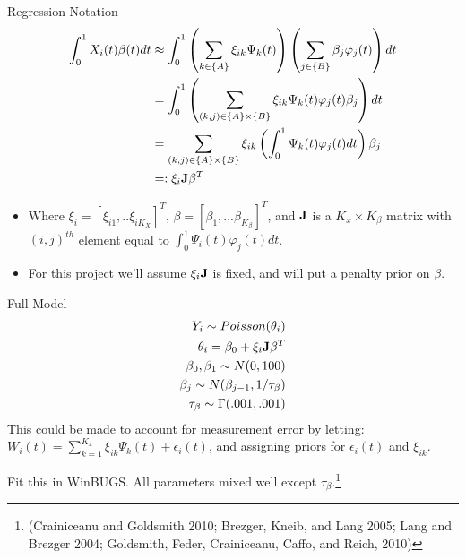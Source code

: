 \documentclass[9 pt]{beamer}
\newcommand{\bi}{\begin{itemize}}
\newcommand{\ei}{\end{itemize}}
\newcommand{\es}[1]{\begin{equation*}\begin{split} #1 \end{split} \end{equation*}}
\begin{document}
\begin{frame}{Regression Notation}
\es{
\int_0^1 X_i(t)\beta(t) dt & \approx \int_0^1 \left( \sum_{k\in \{A\} } \xi_{ik} \Psi_k(t) \right) \left( \sum_{ j\in \{ B\}} \beta_j \varphi_j(t)  \right)dt   \\
 &=\int_0^1 \left(  \sum_{(k,j)\in \{A\}\times \{B\} } \xi_{ik} \Psi_k(t)    \varphi_j(t)   \beta_j \right) dt \\
 &=  \sum_{(k,j)\in \{A\}\times \{B\} } \xi_{ik}  \left( \int_0^1 \Psi_k(t)    \varphi_j(t)  dt \right) \beta_j  \\
 &=: \xi_{i} \bold{J} \beta^T  \\
 }

 \bi
\item<1->   Where $\xi_i=[\xi_{i1},..\xi_{iK_X}]^T$, $\beta=[\beta_1,...\beta_{K_\beta}]^T$, and $\bold{J}$ is a $K_x \times K_\beta$ matrix with $(i,j)^{th}$ element equal to $ \int_0^1 \Psi_i(t)    \varphi_j(t) dt$.
\item<2->  For this project we'll assume $\xi_{i} \bold{J}$ is fixed, and will put a penalty prior on $\beta$.
\ei


\end{frame}


\begin{frame}{Full Model}
\es{
Y_i \sim Poisson(\theta_i) \\
 \theta_i  = \beta_0+ \xi_{i} \bold{J} \beta^T  \\
\beta_0, \beta_1 \sim N(0,100) \\
 \beta_j \sim N(\beta_{j-1},1/\tau_\beta) \\
 \tau_\beta \sim \Gamma(.001,.001)\\
 }
This could be made to account for measurement error by letting: $W_i(t)=
\sum_{k=1}^{K_x} \xi_{ik} \Psi_k(t) + \epsilon_i(t)$, and assigning priors for $\epsilon_i(t)$ and $\xi_{ik}$.\vspace{.1cm}


 Fit this in WinBUGS. All parameters mixed well except $\tau_\beta$.\footnote{(Crainiceanu and Goldsmith 2010; Brezger, Kneib, and Lang 2005; Lang and Brezger 2004; Goldsmith, Feder, Crainiceanu, Caffo, and Reich, 2010)}


\end{frame}
\end{document}
